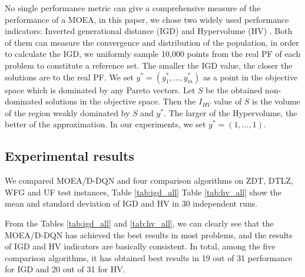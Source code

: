 \documentclass[journal]{IEEEtran}
\begin{document}
No single performance metric can give a comprehensive measure of the performance of a MOEA, in this paper, we chose two widely used performance indicators: Inverted generational distance (IGD) \cite{igd} and Hypervolume (HV) \cite{hv}.
Both of them can measure the convergence and distribution of the population, in order to calculate the IGD, we uniformly sample 10,000 points from the real PF of each problem to constitute a reference set. The smaller the IGD value, the closer the solutions are to the real PF.
We set $y^* = (y^*_1, \dots, y^*_m)$ as a point in the objective space which is dominated by any Pareto vectors. Let $S$ be the obtained non-dominated solutions in the objective space. Then the $I_{HV}$ value of $S$ is the volume of the region weakly dominated by $S$ and $y^*$. The larger of the Hypervolume, the better of the approximation. In our experiments, we set $y^* = (1,\dots, 1).$

\subsection{Experimental results}
We compared MOEA/D-DQN and four comparison algorithms on ZDT, DTLZ, WFG and UF test instances, Table \ref{tab:igd_all} Table \ref{tab:hv_all} show the mean and standard deviation of IGD and HV in 30 independent runs.

From the Tables \ref{tab:igd_all} and \ref{tab:hv_all}, we can clearly see that the MOEA/D-DQN has achieved the best results in most problems, and the results of IGD and HV indicators are basically consistent. In total, among the five comparison algorithms, it has obtained best results in 19 out of 31 performance for IGD and 20 out of 31 for HV.
\end{document}
